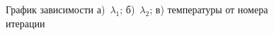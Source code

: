 \documentclass[12pt, twoside]{article}
\begin{document}
\begin{figure}[!ht]
{\begin{minipage}[h]{0.5\linewidth}
\end{minipage}}
\caption{График зависимости а)~$\lambda_1$; б)~$\lambda_2$; в) температуры от номера итерации}
\label{fig:meta_iter}
\end{figure}




\end{document}
